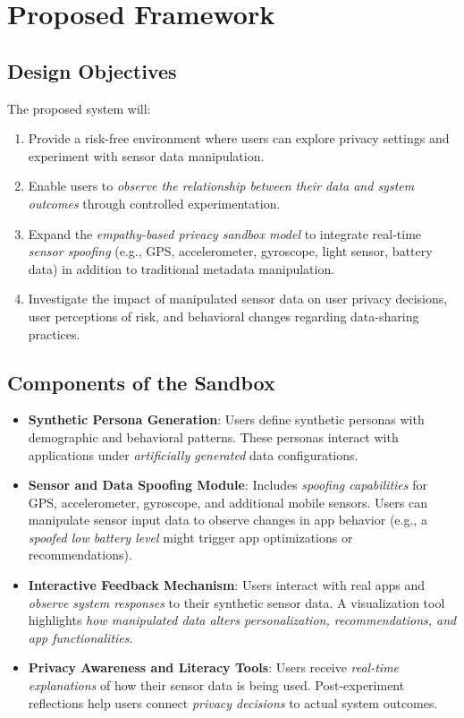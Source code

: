 \documentclass[acmlarge, nonacm]{acmart}
\begin{document}
\section{Proposed Framework}

\subsection{Design Objectives}
The proposed system will:
\begin{enumerate}
    \item Provide a risk-free environment where users can explore privacy settings and experiment with sensor data manipulation.
    \item Enable users to \textit{observe the relationship between their data and system outcomes} through controlled experimentation.
    \item Expand the \textit{empathy-based privacy sandbox model} to integrate real-time \textit{sensor spoofing} (e.g., GPS, accelerometer, gyroscope, light sensor, battery data) in addition to traditional metadata manipulation.
    \item Investigate the impact of manipulated sensor data on user privacy decisions, user perceptions of risk, and behavioral changes regarding data-sharing practices.
\end{enumerate}

\subsection{Components of the Sandbox}
\begin{itemize}
    \item \textbf{Synthetic Persona Generation}: Users define synthetic personas with demographic and behavioral patterns. These personas interact with applications under \textit{artificially generated} data configurations.
    \item \textbf{Sensor and Data Spoofing Module}: Includes \textit{spoofing capabilities} for GPS, accelerometer, gyroscope, and additional mobile sensors. Users can manipulate sensor input data to observe changes in app behavior (e.g., a \textit{spoofed low battery level} might trigger app optimizations or recommendations).
    \item \textbf{Interactive Feedback Mechanism}: Users interact with real apps and \textit{observe system responses} to their synthetic sensor data. A visualization tool highlights \textit{how manipulated data alters personalization, recommendations, and app functionalities}.
    \item \textbf{Privacy Awareness and Literacy Tools}: Users receive \textit{real-time explanations} of how their sensor data is being used. Post-experiment reflections help users connect \textit{privacy decisions} to actual system outcomes.
\end{itemize}
\end{document}
